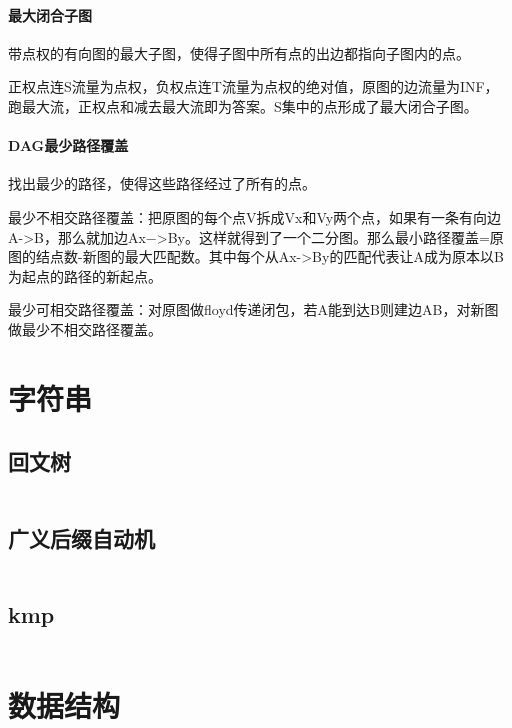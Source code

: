 \documentclass[a4paper,11pt]{article}
\begin{document}
	\paragraph{最大闭合子图}
	带点权的有向图的最大子图，使得子图中所有点的出边都指向子图内的点。
	
	正权点连S流量为点权，负权点连T流量为点权的绝对值，原图的边流量为INF，跑最大流，正权点和减去最大流即为答案。S集中的点形成了最大闭合子图。
    
    \paragraph{DAG最少路径覆盖}
    找出最少的路径，使得这些路径经过了所有的点。
    
    最少不相交路径覆盖：把原图的每个点V拆成Vx和Vy两个点，如果有一条有向边A->B，那么就加边Ax−>By。这样就得到了一个二分图。那么最小路径覆盖=原图的结点数-新图的最大匹配数。其中每个从Ax->By的匹配代表让A成为原本以B为起点的路径的新起点。
    
   	最少可相交路径覆盖：对原图做floyd传递闭包，若A能到达B则建边AB，对新图做最少不相交路径覆盖。
   	
   	






    \newpage
    \section{字符串}

    \subsection{回文树}
    \inputminted[breaklines]{c++}{String/pam.cpp}

    \subsection{广义后缀自动机}
    \inputminted[breaklines]{c++}{String/sam.cpp}

    \subsection{kmp}
    \inputminted[breaklines]{c++}{String/kmp.cpp}


    \newpage
    \section{数据结构}
\end{document}
